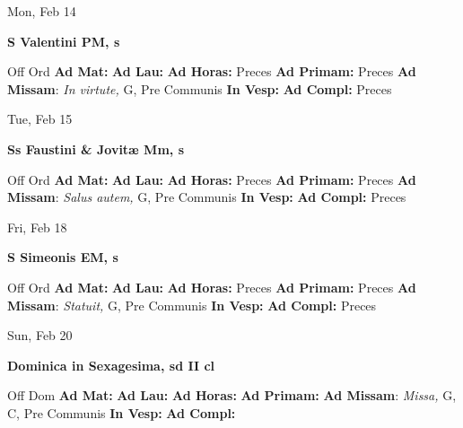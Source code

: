 \documentclass[10pt]{article}
\begin{document}
\begin{minipage}{3.5in}
\vspace{2em}\begin{center}
Mon, Feb 14
\end{center}\textbf{ \large S Valentini PM, \textnormal{\normalsize s}}
\begin{justify}
Off Ord
\textbf{Ad Mat: }
\textbf{Ad Lau: }
\textbf{Ad Horas: }Preces
\textbf{Ad Primam: }Preces
\textbf{Ad Missam}: \textit{In virtute,} G, Pre Communis
\textbf{In Vesp: }
\textbf{Ad Compl: }Preces\end{justify}
\end{minipage}



\begin{minipage}{3.5in}
\vspace{2em}\begin{center}
Tue, Feb 15
\end{center}\textbf{ \large Ss Faustini \& Jovitæ Mm, \textnormal{\normalsize s}}
\begin{justify}
Off Ord
\textbf{Ad Mat: }
\textbf{Ad Lau: }
\textbf{Ad Horas: }Preces
\textbf{Ad Primam: }Preces
\textbf{Ad Missam}: \textit{Salus autem,} G, Pre Communis
\textbf{In Vesp: }
\textbf{Ad Compl: }Preces\end{justify}
\end{minipage}



\begin{minipage}{3.5in}
\vspace{2em}\begin{center}
Fri, Feb 18
\end{center}\textbf{ \large S Simeonis EM, \textnormal{\normalsize s}}
\begin{justify}
Off Ord
\textbf{Ad Mat: }
\textbf{Ad Lau: }
\textbf{Ad Horas: }Preces
\textbf{Ad Primam: }Preces
\textbf{Ad Missam}: \textit{Statuit,} G, Pre Communis
\textbf{In Vesp: }
\textbf{Ad Compl: }Preces\end{justify}
\end{minipage}



\begin{minipage}{3.5in}
\vspace{2em}\begin{center}
Sun, Feb 20
\end{center}\textbf{ \large Dominica in Sexagesima, \textnormal{\normalsize sd II cl}}
\begin{justify}
Off Dom
\textbf{Ad Mat: }
\textbf{Ad Lau: }
\textbf{Ad Horas: }
\textbf{Ad Primam: }
\textbf{Ad Missam}: \textit{Missa,} G, C, Pre Communis
\textbf{In Vesp: }
\textbf{Ad Compl: }\end{justify}
\end{minipage}
\end{document}
